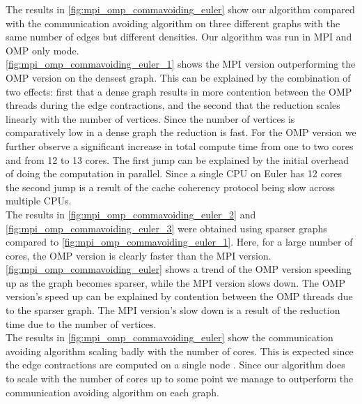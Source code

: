 The results in \autoref{fig:mpi_omp_commavoiding_euler} show our algorithm compared with the
communication avoiding algorithm \cite{comm_avoiding} on three different graphs with the same
number of edges but different densities. Our algorithm was run in MPI and OMP only mode.\\
\autoref{fig:mpi_omp_commavoiding_euler_1} shows the MPI  version outperforming the OMP version on the densest graph. This can be explained by the combination of two effects:
first  that a dense graph results in more contention between the OMP threads during the
edge contractions, and the second  that the reduction  scales linearly
with the number of vertices. Since the number of vertices is comparatively low in a dense graph the
reduction is fast. For the OMP  version we further observe a significant increase in total
compute time from one to two cores and from 12 to 13 cores. The first jump can be explained by the
initial overhead of doing the computation in parallel. Since a single CPU on Euler has 12 cores the
second jump is a result of  the cache coherency protocol being slow across multiple CPUs.\\
The results in \autoref{fig:mpi_omp_commavoiding_euler_2} and
\autoref{fig:mpi_omp_commavoiding_euler_3} were obtained using sparser graphs compared to
\autoref{fig:mpi_omp_commavoiding_euler_1}. Here, for a large number of cores, the OMP  version
is clearly faster than the MPI  version. \autoref{fig:mpi_omp_commavoiding_euler} shows a trend
of the OMP  version speeding up as the graph becomes sparser, while the MPI  version slows
down. The OMP  version's speed up can be explained by  contention between the OMP
threads due to the sparser graph. The MPI  version's slow down is a result of the 
reduction time due to the  number of vertices.\\
The results in \autoref{fig:mpi_omp_commavoiding_euler} show the communication avoiding algorithm
scaling badly with the number of cores. This is expected since the edge contractions are computed
on a single node . Since our algorithm does to scale with the number of cores up
to some point we manage to outperform the communication avoiding algorithm on each graph.


